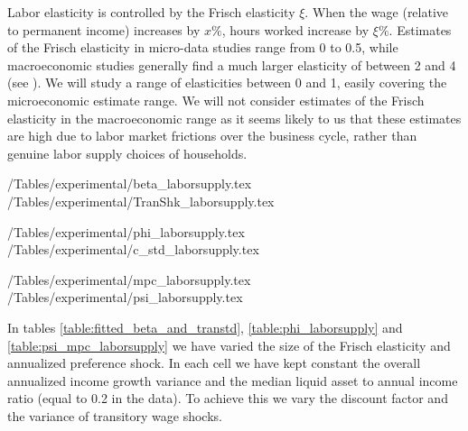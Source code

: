 \documentclass[titlepage]{\econtex}\newcommand{\texname}{ConsumptionHeterogeneity}
\begin{document}
Labor elasticity is controlled by the Frisch elasticity $\xi$. When the wage (relative to permanent income) increases by $x\%$, hours worked increase by $\xi\%$. Estimates of the Frisch elasticity in micro-data studies range from 0 to 0.5, while macroeconomic studies generally find a much larger elasticity of between 2 and 4 (see \cite{peterman_reconciling_2016}). We will study a range of elasticities between 0 and 1, easily covering the microeconomic estimate range. We will not consider estimates of the Frisch elasticity in the macroeconomic range as it seems likely to us that these estimates are high due to labor market frictions over the business cycle, rather than genuine labor supply choices of households.

\begin{center}
	\econtexRoot/Tables/experimental/beta_laborsupply.tex	
	\econtexRoot/Tables/experimental/TranShk_laborsupply.tex		
	\label{table:fitted_beta_and_transtd}
\end{center}

\begin{center}
	\econtexRoot/Tables/experimental/phi_laborsupply.tex	
	\econtexRoot/Tables/experimental/c_std_laborsupply.tex		
	\label{table:phi_laborsupply}
\end{center}

\begin{center}
	\econtexRoot/Tables/experimental/mpc_laborsupply.tex
	\econtexRoot/Tables/experimental/psi_laborsupply.tex		
	\label{table:psi_mpc_laborsupply}
\end{center}

In tables \ref{table:fitted_beta_and_transtd}, \ref{table:phi_laborsupply} and \ref{table:psi_mpc_laborsupply} we have varied the size of the Frisch elasticity and annualized preference shock. In each cell we have kept constant the overall annualized income growth variance and the median liquid asset to annual income ratio (equal to 0.2 in the data). To achieve this we vary the discount factor and the variance of transitory wage shocks.
\end{document}
